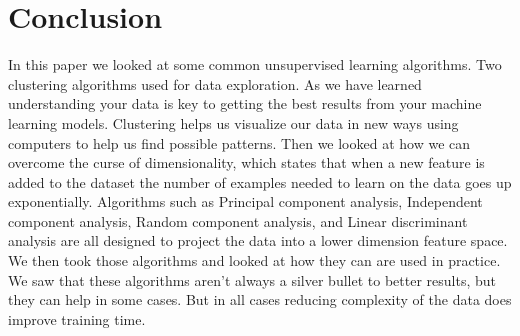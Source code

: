 \documentclass[
letterpaper, %
]{IEEEtran}
\begin{document}
	\section{Conclusion}
	In this paper we looked at some common unsupervised learning algorithms. Two clustering algorithms used for data exploration. As we have learned understanding your data is key to getting the best results from your machine learning models. Clustering helps us visualize our data in new ways using computers to help us find possible patterns. Then we looked at how we can overcome the curse of dimensionality, which states that when a new feature is added to the dataset the number of examples needed to learn on the data goes up exponentially. Algorithms such as Principal component analysis, Independent component analysis, Random component analysis, and Linear discriminant analysis are all designed to project the data into a lower dimension feature space. We then took those algorithms and looked at how they can are used in practice. We saw that these algorithms aren't always a silver bullet to better results, but they can help in some cases. But in all cases reducing complexity of the data does improve training time.
	
	\nocite{*}
	\printbibliography[
	heading=bibintoc,
	title={References}
	] %
\end{document}
